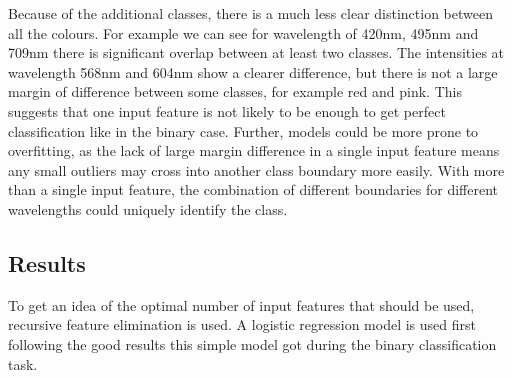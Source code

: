\documentclass{article}
\begin{document}
\noindent
Because of the additional classes, there is a much less clear distinction between all the colours. For example we can see for wavelength of 420nm, 495nm and 709nm there is significant overlap between at least two classes. The intensities at wavelength 568nm and 604nm show a clearer difference, but there is not a large margin of difference between some classes, for example red and pink. This suggests that one input feature is not likely to be enough to get perfect classification like in the binary case. Further, models could be more prone to overfitting, as the lack of large margin difference in a single input feature means any small outliers may cross into another class boundary more easily. With more than a single input feature, the combination of different boundaries for different wavelengths could uniquely identify the class. 

\subsection{Results}
To get an idea of the optimal number of input features that should be used, recursive feature elimination is used. A logistic regression model is used first following the good results this simple model got during the binary classification task. 
\end{document}

